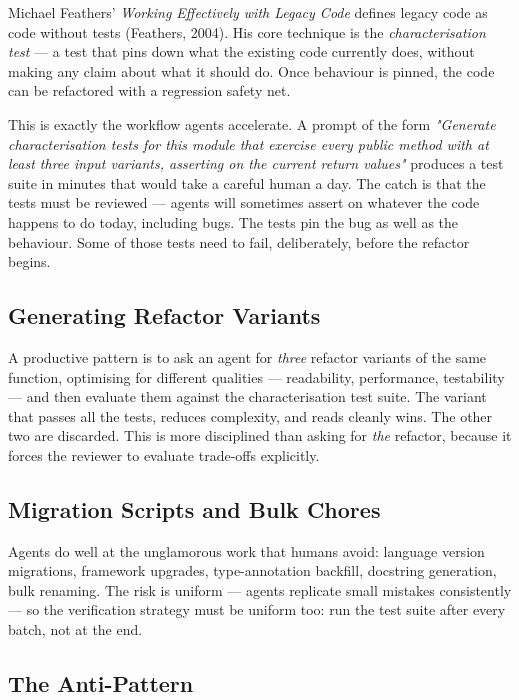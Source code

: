 \documentclass[11pt,a4paper]{book}
\begin{document}
Michael Feathers' \textit{Working Effectively with Legacy Code} defines legacy code as code without tests (Feathers, 2004). His core technique is the \textit{characterisation test} --- a test that pins down what the existing code currently does, without making any claim about what it should do. Once behaviour is pinned, the code can be refactored with a regression safety net.

This is exactly the workflow agents accelerate. A prompt of the form \textit{"Generate characterisation tests for this module that exercise every public method with at least three input variants, asserting on the current return values"} produces a test suite in minutes that would take a careful human a day. The catch is that the tests must be reviewed --- agents will sometimes assert on whatever the code happens to do today, including bugs. The tests pin the bug as well as the behaviour. Some of those tests need to fail, deliberately, before the refactor begins.

\subsection{Generating Refactor Variants}

A productive pattern is to ask an agent for \textit{three} refactor variants of the same function, optimising for different qualities --- readability, performance, testability --- and then evaluate them against the characterisation test suite. The variant that passes all the tests, reduces complexity, and reads cleanly wins. The other two are discarded. This is more disciplined than asking for \textit{the} refactor, because it forces the reviewer to evaluate trade-offs explicitly.

\subsection{Migration Scripts and Bulk Chores}

Agents do well at the unglamorous work that humans avoid: language version migrations, framework upgrades, type-annotation backfill, docstring generation, bulk renaming. The risk is uniform --- agents replicate small mistakes consistently --- so the verification strategy must be uniform too: run the test suite after every batch, not at the end.

\subsection{The Anti-Pattern}
\end{document}
